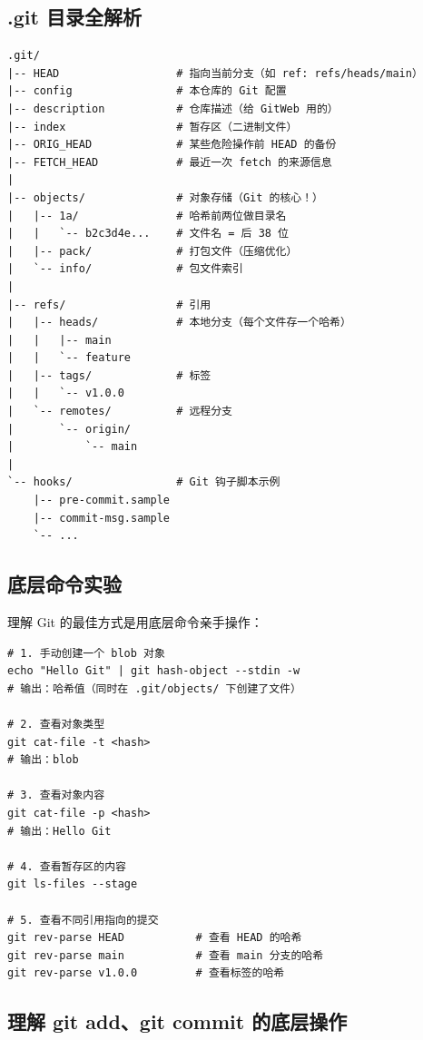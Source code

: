 \documentclass[12pt,a4paper]{article}
\begin{document}
\subsection{.git 目录全解析}

\begin{lstlisting}[numbers=none]
.git/
|-- HEAD                  # 指向当前分支（如 ref: refs/heads/main）
|-- config                # 本仓库的 Git 配置
|-- description           # 仓库描述（给 GitWeb 用的）
|-- index                 # 暂存区（二进制文件）
|-- ORIG_HEAD             # 某些危险操作前 HEAD 的备份
|-- FETCH_HEAD            # 最近一次 fetch 的来源信息
|
|-- objects/              # 对象存储（Git 的核心！）
|   |-- 1a/               # 哈希前两位做目录名
|   |   `-- b2c3d4e...    # 文件名 = 后 38 位
|   |-- pack/             # 打包文件（压缩优化）
|   `-- info/             # 包文件索引
|
|-- refs/                 # 引用
|   |-- heads/            # 本地分支（每个文件存一个哈希）
|   |   |-- main
|   |   `-- feature
|   |-- tags/             # 标签
|   |   `-- v1.0.0
|   `-- remotes/          # 远程分支
|       `-- origin/
|           `-- main
|
`-- hooks/                # Git 钩子脚本示例
    |-- pre-commit.sample
    |-- commit-msg.sample
    `-- ...
\end{lstlisting}

\subsection{底层命令实验}

理解 Git 的最佳方式是用底层命令亲手操作：

\begin{lstlisting}
# 1. 手动创建一个 blob 对象
echo "Hello Git" | git hash-object --stdin -w
# 输出：哈希值（同时在 .git/objects/ 下创建了文件）

# 2. 查看对象类型
git cat-file -t <hash>
# 输出：blob

# 3. 查看对象内容
git cat-file -p <hash>
# 输出：Hello Git

# 4. 查看暂存区的内容
git ls-files --stage

# 5. 查看不同引用指向的提交
git rev-parse HEAD           # 查看 HEAD 的哈希
git rev-parse main           # 查看 main 分支的哈希
git rev-parse v1.0.0         # 查看标签的哈希
\end{lstlisting}

\subsection{理解 git add、git commit 的底层操作}
\end{document}
